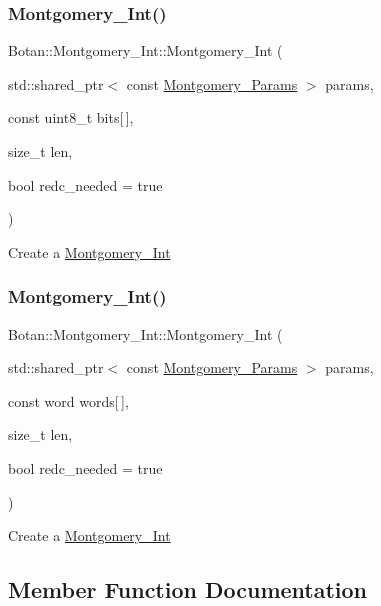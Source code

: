 \subsubsection{\texorpdfstring{Montgomery\+\_\+\+Int()}{Montgomery\_Int()}\hspace{0.1cm}{\footnotesize\ttfamily [3/4]}}
{\footnotesize\ttfamily Botan\+::\+Montgomery\+\_\+\+Int\+::\+Montgomery\+\_\+\+Int (\begin{DoxyParamCaption}\item[{std\+::shared\+\_\+ptr$<$ const \hyperlink{class_botan_1_1_montgomery___params}{Montgomery\+\_\+\+Params} $>$}]{params,  }\item[{const uint8\+\_\+t}]{bits\mbox{[}$\,$\mbox{]},  }\item[{size\+\_\+t}]{len,  }\item[{bool}]{redc\+\_\+needed = {\ttfamily true} }\end{DoxyParamCaption})}

Create a \hyperlink{class_botan_1_1_montgomery___int}{Montgomery\+\_\+\+Int} \mbox{\label{class_botan_1_1_montgomery___int_a5b3ce373167c2c897ffa6264327eec61}} 
\subsubsection{\texorpdfstring{Montgomery\+\_\+\+Int()}{Montgomery\_Int()}\hspace{0.1cm}{\footnotesize\ttfamily [4/4]}}
{\footnotesize\ttfamily Botan\+::\+Montgomery\+\_\+\+Int\+::\+Montgomery\+\_\+\+Int (\begin{DoxyParamCaption}\item[{std\+::shared\+\_\+ptr$<$ const \hyperlink{class_botan_1_1_montgomery___params}{Montgomery\+\_\+\+Params} $>$}]{params,  }\item[{const word}]{words\mbox{[}$\,$\mbox{]},  }\item[{size\+\_\+t}]{len,  }\item[{bool}]{redc\+\_\+needed = {\ttfamily true} }\end{DoxyParamCaption})}

Create a \hyperlink{class_botan_1_1_montgomery___int}{Montgomery\+\_\+\+Int} 

\subsection{Member Function Documentation}
\mbox{\label{class_botan_1_1_montgomery___int_aad869bdd9eb0dd780774f430169d9af1}} 
